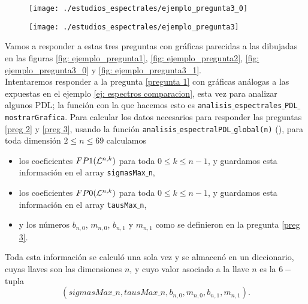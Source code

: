 \begin{figure}[H]
	\centering
	\texttt{[image: ./estudios\_espectrales/ejemplo\_pregunta3\_0]} 
\end{figure}	

\begin{figure}[H]
	\centering
	\texttt{[image: ./estudios\_espectrales/ejemplo\_pregunta3]} 
\end{figure}	


Vamos a responder a estas tres preguntas con gráficas parecidas
a las dibujadas en las figuras
\ref{fig: ejemplo_pregunta1},
\ref{fig: ejemplo_pregunta2},
\ref{fig: ejemplo_pregunta3_0} y
\ref{fig: ejemplo_pregunta3_1}. \\


Intentaremos responder a la pregunta \ref{pregunta 1}
con gráficas análogas
a las expuestas en el ejemplo
\ref{ej: espectros comparacion},
esta vez para analizar algunos PDL; la función con la que
hacemos esto es
\texttt{analisis$\_$espectrales$\_$PDL$\_$mostrarGrafica}. 
Para calcular los datos necesarios para responder
las preguntas \ref{preg 2} y \ref{preg 3},
usando la función \texttt{analisis$\_$espectralPDL$\_$global(n)}
(), 
para toda dimensión
$2 \leq n \leq 69$ calculamos
\begin{itemize}
	\item los coeficientes $FP1(\mathcal{L}^{n,k})$ para toda
	$0 \leq k \leq n-1$, y guardamos esta información en el
	array \texttt{sigmasMax$\_$n},
	\item los coeficientes $FP0(\mathcal{L}^{n,k})$ para toda
	$0 \leq k \leq n-1$, y guardamos esta información en el
	array \texttt{tausMax$\_$n},
	\item y los números $b_{n,0}$, $m_{n,0}$,
	$b_{n,1}$ y $m_{n,1}$ como se definieron en la pregunta
	\ref{preg 3}.
\end{itemize}
Toda esta información se calculó una sola vez y se almacenó
en un diccionario, cuyas llaves son las dimensiones
$n$, y cuyo valor asociado a la llave $n$ es la $6-$tupla
\[
(sigmasMax\_n, tausMax\_n, b_{n,0}, m_{n,0}, b_{n,1}, m_{n,1}).
\]

